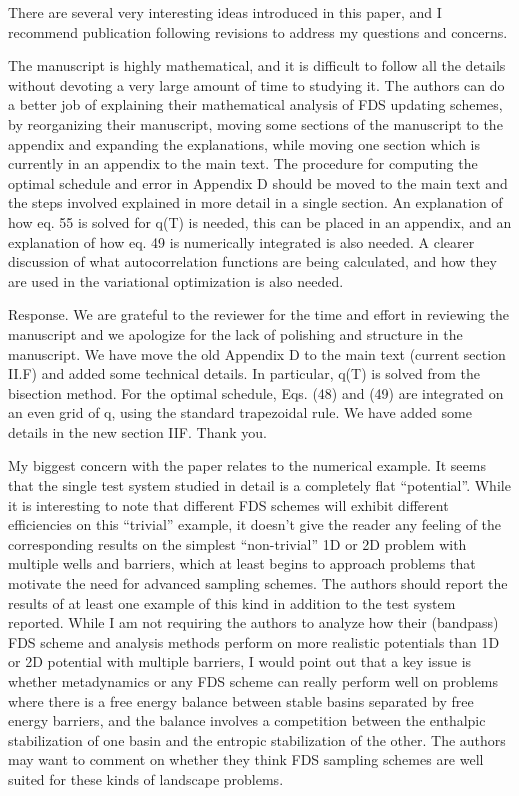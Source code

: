 \documentclass[preprint, superscriptaddress, floatfix]{revtex4-1}
\begin{document}
There are several very interesting ideas introduced in this paper, and I recommend publication
following revisions to address my questions and concerns.

The manuscript is highly mathematical, and it is difficult to follow all the details without
devoting a very large amount of time to studying it. The authors can do a better job of
explaining their mathematical analysis of FDS updating schemes, by reorganizing their
manuscript, moving some sections of the manuscript to the appendix and expanding the
explanations, while moving one section which is currently in an appendix to the main text. The
procedure for computing the optimal schedule and error in Appendix D should be moved to the
main text and the steps involved explained in more detail in a single section. An explanation of
how eq. 55 is solved for q(T) is needed, this can be placed in an appendix, and an explanation of
how eq. 49 is numerically integrated is also needed. A clearer discussion of what autocorrelation
functions are being calculated, and how they are used in the variational optimization is also
needed.

Response.
We are grateful to the reviewer for the time and effort in reviewing the manuscript and we apologize for the lack of polishing and structure in the manuscript.
We have move the old Appendix D to the main text (current section II.F)
and added some technical details.
In particular, q(T) is solved from the bisection method.
For the optimal schedule,
Eqs. (48) and (49) are integrated on an even grid of q,
using the standard trapezoidal rule.
We have added some details in the new section IIF.
Thank you.



My biggest concern with the paper relates to the numerical example. It seems that the single test
system studied in detail is a completely flat “potential”. While it is interesting to note that
different FDS schemes will exhibit different efficiencies on this “trivial” example, it doesn’t give
the reader any feeling of the corresponding results on the simplest “non-trivial” 1D or 2D
problem with multiple wells and barriers, which at least begins to approach problems that
motivate the need for advanced sampling schemes. The authors should report the results of at
least one example of this kind in addition to the test system reported. While I am not requiring
the authors to analyze how their (bandpass) FDS scheme and analysis methods perform on more
realistic potentials than 1D or 2D potential with multiple barriers, I would point out that a key
issue is whether metadynamics or any FDS scheme can really perform well on problems where
there is a free energy balance between stable basins separated by free energy barriers, and the
balance involves a competition between the enthalpic stabilization of one basin and the entropic
stabilization of the other. The authors may want to comment on whether they think FDS
sampling schemes are well suited for these kinds of landscape problems.
\end{document}
